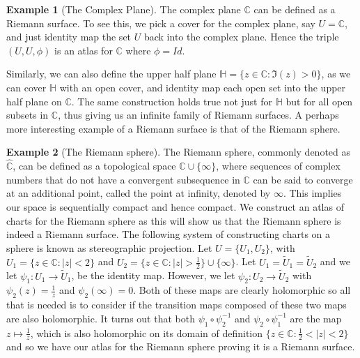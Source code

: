 \documentclass[11pt]{report}
\theoremstyle{definition}
\newtheorem*{example*}{Example}
\begin{document}
\begin{example*}[The Complex Plane]
  The complex plane $\mathbb{C}$ can be defined as a Riemann surface. To see this, we pick a cover for the complex plane, say $U = \mathbb{C}$, and just identity map the set $U$ back into the complex plane. Hence the triple $(U,U,\phi)$ is an atlas for $\mathbb{C}$ where $\phi=Id$.
\end{example*}
Similarly, we can also define the upper half plane $\mathbb{H}=\{ z \in \mathbb{C} \colon \Im(z)>0\}$, as we can cover $\mathbb{H}$ with an open cover, and identity map each open set into the upper half plane on $\mathbb{C}$. The same construction holds true not just for $\mathbb{H}$ but for all open subsets in $\mathbb{C}$, thus giving us an infinite family of Riemann surfaces. A perhaps more interesting example of a Riemann surface is that of the Riemann sphere.

\begin{example*}[The Riemann sphere]
  The Riemann sphere, commonly denoted as $\widehat{\mathbb{C}}$, can be defined as a topological space $\mathbb{C} \cup \{\infty\}$, where sequences of complex numbers that do not have a convergent subsequence in $\mathbb{C}$ can be said to converge at an additional point, called the point at infinity, denoted by $\infty$. This implies our space is sequentially compact and hence compact. We construct an atlas of charts for the Riemann sphere as this will show us that the Riemann sphere is indeed a Riemann surface. The following system of constructing charts on a sphere is known as stereographic projection. Let $U=\{U_1,U_2\}$, with $U_1=\{z \in \mathbb{C} : |z| < 2\}$ and $U_2=\{z \in \mathbb{C} : |z| > \frac{1}{2}\}\cup \{\infty\}$. Let $U_1=\tilde{U}_1=\tilde{U}_2$ and we let $\psi_1:U_1 \rightarrow \tilde{U}_1$, be the identity map. However, we let $\psi_2:U_2 \rightarrow \tilde{U}_2$ with $\psi_2(z)=\frac{1}{z}$ and $\psi_2(\infty)=0$. Both of these maps are clearly holomorphic so all that is needed is to consider if the transition maps composed of these two maps are also holomorphic.
  It turns out that both $\psi_1 \circ \psi_2 ^{-1}$ and $\psi_2 \circ \psi_1 ^{-1}$ are the map $z \mapsto \frac{1}{z}$, which is also holomorphic on its domain of definition $\{z\in \mathbb{C} : \frac{1}{2} < |z| < 2\}$ and so we have our atlas for the Riemann sphere proving it is a Riemann surface.
\end{example*}
\end{document}
